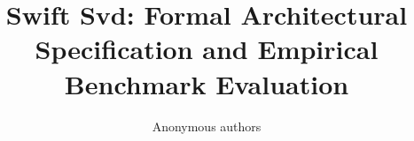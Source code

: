 \title{\textbf{Swift Svd: Formal Architectural Specification and Empirical Benchmark Evaluation}}

\author{Anonymous authors}
